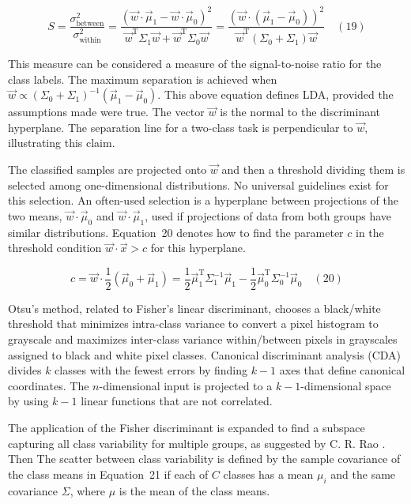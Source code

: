 \documentclass[preprint,12pt]{elsarticle}
\begin{document}
\begin{equation}
	S={\frac{\sigma_{\text{between}}^{2}}{\sigma_{\text{within}}^{2}}}={\frac{({\vec{w}}\cdot{\vec{\mu}}_{1}-{\vec{w}}\cdot {\vec{\mu}}_{0})^{2}}{{\vec{w}}^{\mathrm{T}}\Sigma_{1}{\vec{w}}+{\vec{w}}^{\mathrm{T}}\Sigma_{0}{\vec{w}}}}={\frac{({\vec{w}}\cdot ({\vec{\mu}}_{1}-{\vec{\mu}}_{0}))^{2}}{{\vec{w}}^{\mathrm{T}}(\Sigma_{0}+\Sigma_{1}){\vec{w}}}}
	\quad\left(19\right)
\end{equation}

This measure can be considered a measure of the signal-to-noise ratio for the class labels. The maximum separation is achieved when ${\vec{w}}\propto\left(\Sigma_{0}+\Sigma_{1}\right)^{-1}\left({\vec{\mu}}_{1}-{\vec{\mu}}_{0}\right)$. This above equation defines LDA, provided the assumptions made were true.
The vector  $\vec{w}$ is the normal to the discriminant hyperplane. The separation line for a two-class task is perpendicular to $\vec{w}$, illustrating this claim.

The classified samples are projected onto $\vec{w}$ and then a threshold dividing them is selected among one-dimensional distributions. No universal guidelines exist for this selection. An often-used selection is a hyperplane between projections of the two means, ${\vec{w}}\cdot {\vec{\mu}}_{0}$ and $ \vec{w} \cdot {\vec{\mu}}_{1}$, used if projections of data from both groups have similar distributions. 
Equation~20 denotes how to find the parameter $c$ in the threshold condition ${\vec{w}}\cdot {\vec{x}} > c$ for this hyperplane.

\begin{equation}
	c={\vec{w}}\cdot {\frac{1}{2}}({\vec{\mu}}_{0}+{\vec{\mu}}_{1})={\frac{1}{2}}{\vec{\mu}}_{1}^{\mathrm{T}}\Sigma_{1}^{-1}{\vec{\mu}}_{1}-{\frac{1}{2}}{\vec{\mu}}_{0}^{\mathrm{T}}\Sigma_{0}^{-1}{\vec{\mu}}_{0}
	\quad\left(20\right)
\end{equation}

Otsu's method, related to Fisher's linear discriminant, chooses a black/white threshold that minimizes intra-class variance to convert a pixel histogram to grayscale and maximizes inter-class variance within/between pixels in grayscales assigned to black and white pixel classes. Canonical discriminant analysis (CDA) divides $k$ classes with the fewest errors by finding $k - 1$ axes that define canonical coordinates. The $n$-dimensional input is projected to a $k - 1$-dimensional space by using $k - 1$ linear functions that are not correlated.

The application of the Fisher discriminant is expanded to find a subspace capturing all class variability \cite{archive765Discriminant} for multiple groups, as suggested by C. R. Rao \cite{rao1948utilization}. Then The scatter between class variability is defined by the sample covariance of the class means in Equation~21 if each of $C$ classes has a mean $\mu_{i}$ and the same covariance  $\Sigma$, where $\mu$ is the mean of the class means.
\end{document}
